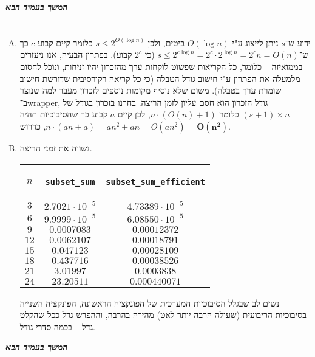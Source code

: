 \documentclass[]{article}
\makeatletter
\newcommand\en[1] {\begin{otherlanguage}{english}#1\end{otherlanguage}}
\newcommand\sen   {\begin{otherlanguage}{english}}
\newcommand\she   {\end{otherlanguage}}
\newcommand\ttt[1]{\en{\footnotesize\texttt{#1}\normalsize}}
\newcommand\npage {\vfil {\hfil \textbf{\textit{המשך בעמוד הבא}}} \hfil \vfil \pagebreak}
\newcommand{\skipitems}[1]{
	\addtocounter{\@enumctr}{#1}
}
\newcommand\logn  {\log n}
\makeatother
\begin{document}
\begin{enumerate}[A']
		\end{enumerate}
		
		\npage
		\section{} %
		\begin{enumerate}[A.]
			\skipitems{1}
			\item ידוע ש־$s$ ניתן לייצוג ע"י $O(\logn)$ ביטים, ולכן $s \le 2^{O(\logn)}$ כלומר קיים קבוע $c$ כך ש־$s \le 2^{c\logn} = 2^c \cdot 2^{\logn} = 2^cn = O(n)$ (כי $2^c$ קבוע). בפתרון הבעיה, אנו ניעזרים בממואיזה – כלומר, כל הקריאות שפשוט לוקחות ערך מהזכרון יהיו זניחות, ונוכל לחסום מלמעלה את הפתרון ע"י חישוב גודל הטבלה (כי כל קריאה רקורסיבית שדורשת חישוב שומרת ערך בטבלה). משום שלא נוסיף מקומות נוספים לזכרון מעבר למה שנוצר ב־wrapper, גודל הזכרון הוא חסם עליון לזמן הריצה. בחרנו בזכרון בגודל של $(s + 1) \times n$ כלומר $n \cdot (O(n) + 1)$, לכן קיים $a$ קבוע כך שהסיבוכיות תהיה $n \cdot (an + a) = an^2 + an = O(an^2) = \bm{O(n^2)}$, כדרוש. 
			\item נשווה את זמני הריצה. 
			\begin{center}\sen\begin{tabular}{|c|c|c|}
					\hline $n$ & \ttt{subset\_sum} & \ttt{subset\_sum\_efficient} \\
					\hline $3$ & $2.7021 \cdot 10^{-5}$ & $4.73389 \cdot 10^{-5}$ \\ 
					\hline $6$ & $9.9999 \cdot 10^{-5}$ & $6.08550 \cdot 10^{-5}$ \\ 
					\hline $9$ & $0.0007083$ & $0.00012372$ \\ 
					\hline $12$ & $0.0062107$ & $0.00018791$ \\ 
					\hline $15$ & $0.047123$ & $0.00028109$ \\ 
					\hline $18$ & $0.437716$ & $0.00038526$ \\ 
					\hline $21$ & $3.01997$ & $0.0003838$ \\ 
					\hline $24$ & $23.20511$ & $0.000440071$ \\ 
					\hline
			\end{tabular}\she\end{center}
			נשים לב שבגלל הסיבוכיות המערכית של הפונקציה הראשונה, הפונקציה השנייה בסיבוכיות הריבועית (שעולה הרבה יותר לאט) מהירה בהרבה, וההפרש גדל ככל שהקלט גדל – בכמה סדרי גודל. 
		\end{enumerate}
		
		\npage
\end{document}
